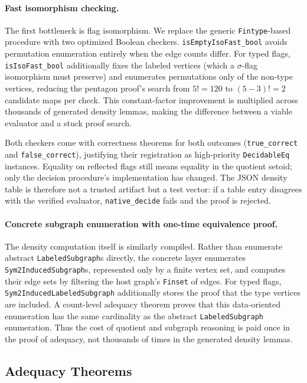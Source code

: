 \documentclass{article}
\newcommand{\lean}[1]{\texttt{#1}}
\begin{document}
\paragraph{Fast isomorphism checking.}
The first bottleneck is flag isomorphism.  We replace the generic
\lean{Fintype}-based procedure with two optimized Boolean checkers.
\lean{isEmptyIsoFast\_bool} avoids permutation enumeration entirely when the
edge counts differ.  For typed flags, \lean{isIsoFast\_bool} additionally
fixes the labeled vertices (which a $\sigma$-flag isomorphism must preserve)
and enumerates permutations only of the non-type vertices, reducing the
pentagon proof's search from $5! = 120$ to $(5-3)! = 2$ candidate maps per
check.  This constant-factor improvement is multiplied across thousands of
generated density lemmas, making the difference between a viable evaluator
and a stuck proof search.

Both checkers come with correctness theorems for both outcomes
(\lean{true\_correct} and \lean{false\_correct}), justifying their
registration as high-priority \lean{DecidableEq} instances.  Equality on
reflected flags still means equality in the quotient setoid; only the
decision procedure's implementation has changed.  The JSON density table is
therefore not a trusted artifact but a test vector: if a table entry
disagrees with the verified evaluator, \lean{native\_decide} fails and the
proof is rejected.

\paragraph{Concrete subgraph enumeration with one-time equivalence proof.}
The density computation itself is similarly compiled.  Rather than enumerate
abstract \lean{LabeledSubgraph}s directly, the concrete layer enumerates
\lean{Sym2InducedSubgraph}s, represented only by a finite vertex set, and
computes their edge sets by filtering the host graph's \lean{Finset} of
edges.  For typed flags, \lean{Sym2InducedLabeledSubgraph} additionally
stores the proof that the type vertices are included.  A count-level
adequacy theorem proves that this data-oriented enumeration has the same
cardinality as the abstract \lean{LabeledSubgraph} enumeration.  Thus the
cost of quotient and subgraph reasoning is paid once in the proof of
adequacy, not thousands of times in the generated density lemmas.

\subsection{Adequacy Theorems}
\end{document}
